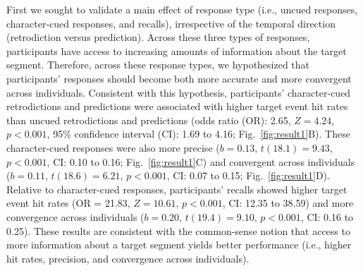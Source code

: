 \documentclass[10pt]{article}
\begin{document}
First we sought to validate a main effect of response type (i.e., uncued responses, character-cued responses, and recalls), irrespective of the temporal direction (retrodiction versus prediction).  Across these three types of responses, participants have access to increasing amounts of information about the target segment.  Therefore, across these response types, we hypothesized that participants' responses should become both more accurate and more convergent across individuals.  Consistent with this hypothesis, participants' character-cued retrodictions and predictions were associated with higher target event hit rates than uncued retrodictions and predictions (odds ratio (OR): 2.65, $Z = 4.24$, $p < 0.001$, 95\% confidence interval (CI): 1.69 to 4.16; Fig.~\ref{fig:result1}B).  These character-cued responses were also more precise ($b = 0.13$, $t(18.1) = 9.43$, $p < 0.001$, CI: 0.10 to 0.16; Fig.~\ref{fig:result1}C) and convergent across individuals ($b = 0.11$, $t(18.6) = 6.21$, $p < 0.001$, CI: 0.07 to 0.15; Fig.~\ref{fig:result1}D).   Relative to character-cued responses, participants' recalls showed higher target event hit rates (OR = 21.83, $Z = 10.61$, $p < 0.001$, CI: 12.35 to 38.59) and more convergence across individuals ($b = 0.20$, $t(19.4) = 9.10$, $p < 0.001$, CI: 0.16 to 0.25). These results are consistent with the common-sense notion that access to more information about a target segment yields better performance (i.e., higher hit rates, precision, and convergence across individuals).
\end{document}

